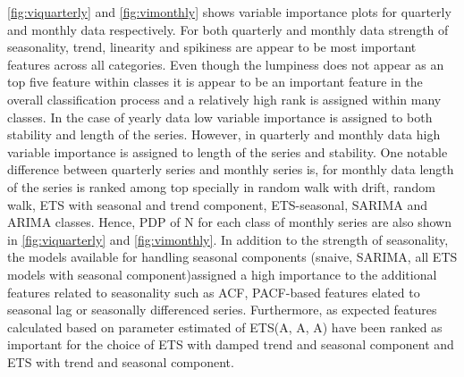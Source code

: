 \documentclass[11pt,a4paper,]{article}
\begin{document}
\autoref{fig:viquarterly} and \autoref{fig:vimonthly} shows variable
importance plots for quarterly and monthly data respectively. For both
quarterly and monthly data strength of seasonality, trend, linearity and
spikiness are appear to be most important features across all
categories. Even though the lumpiness does not appear as an top five
feature within classes it is appear to be an important feature in the
overall classification process and a relatively high rank is assigned
within many classes. In the case of yearly data low variable importance
is assigned to both stability and length of the series. However, in
quarterly and monthly data high variable importance is assigned to
length of the series and stability. One notable difference between
quarterly series and monthly series is, for monthly data length of the
series is ranked among top specially in random walk with drift, random
walk, ETS with seasonal and trend component, ETS-seasonal, SARIMA and
ARIMA classes. Hence, PDP of N for each class of monthly series are also
shown in \autoref{fig:viquarterly} and \autoref{fig:vimonthly}. In
addition to the strength of seasonality, the models available for
handling seasonal components (snaive, SARIMA, all ETS models with
seasonal component)assigned a high importance to the additional features
related to seasonality such as ACF, PACF-based features elated to
seasonal lag or seasonally differenced series. Furthermore, as expected
features calculated based on parameter estimated of ETS(A, A, A) have
been ranked as important for the choice of ETS with damped trend and
seasonal component and ETS with trend and seasonal component.
\end{document}
